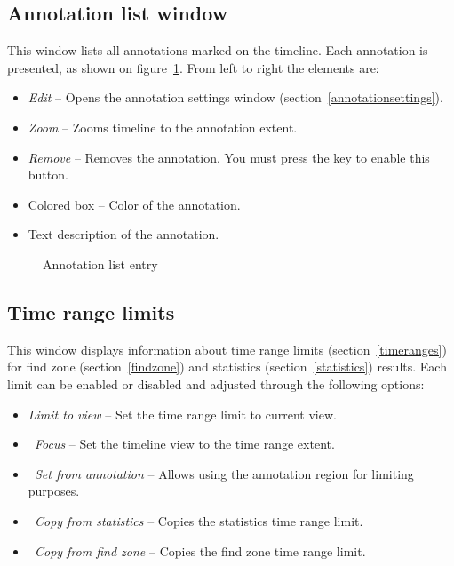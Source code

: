 \documentclass[hidelinks,titlepage,a4paper]{article}
\begin{document}
\subsection{Annotation list window}
\label{annotationlist}

This window lists all annotations marked on the timeline. Each annotation is presented, as shown on figure~\ref{figannlist}. From left to right the elements are:

\begin{itemize}
\item \emph{\faEdit{} Edit} -- Opens the annotation settings window (section~\ref{annotationsettings}).
\item \emph{\faMicroscope{} Zoom} -- Zooms timeline to the annotation extent.
\item \emph{\faTrash*{} Remove} -- Removes the annotation. You must press the \keys{\ctrl} key to enable this button.
\item Colored box -- Color of the annotation.
\item Text description of the annotation.
\end{itemize}

\begin{figure}[h]
\centering{}
\caption{Annotation list entry}
\label{figannlist}
\end{figure}

\subsection{Time range limits}
\label{timerangelimits}

This window displays information about time range limits (section~\ref{timeranges}) for find zone (section~\ref{findzone}) and statistics (section~\ref{statistics}) results. Each limit can be enabled or disabled and adjusted through the following options:

\begin{itemize}
\item \emph{Limit to view} -- Set the time range limit to current view.
\item \emph{\faMicroscope{}~Focus} -- Set the timeline view to the time range extent.
\item \emph{\faStickyNote{}~Set from annotation} -- Allows using the annotation region for limiting purposes.
\item \emph{\faSortAmountUp{}~Copy from statistics} -- Copies the statistics time range limit.
\item \emph{\faSearch{}~Copy from find zone} -- Copies the find zone time range limit.
\end{itemize}
\end{document}

